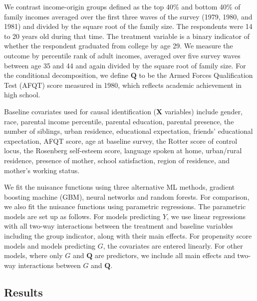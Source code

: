 \documentclass[12pt,a4paper]{article}
\def\X{{\boldsymbol X}}
\def\Q{{\boldsymbol Q}}
\begin{document}
We contrast income-origin groups defined as the top 40\% and bottom 40\% of family incomes averaged over the first three waves of the survey (1979, 1980, and 1981) and divided by the square root of the family size. The respondents were 14 to 20 years old during that time. The treatment variable is a binary indicator of whether the respondent graduated from college by age 29. We measure the outcome by percentile rank of adult incomes, averaged over five survey waves between age 35 and 44 and again divided by the square root of family size. For the conditional decomposition, we define $\Q$ to be the Armed Forces Qualification Test (AFQT) score measured in 1980, which reflects academic achievement in high school. 

Baseline covariates used for causal identification ($\X$ variables) include gender, race, parental income percentile, parental education, parental presence, the number of siblings, urban residence, educational expectation, friends' educational expectation, AFQT score, age at baseline survey, the Rotter score of control locus, the Rosenberg self-esteem score, language spoken at home, urban/rural residence, presence of mother, school satisfaction, region of residence, and mother's working status. 

We fit the nuisance functions using three alternative ML methods, gradient boosting machine (GBM), neural networks and random forests. For comparison, we also fit the nuisance functions using parametric regressions. The parametric models are set up as follows. For models predicting $Y$, we use linear regressions with all two-way interactions between the treatment and  baseline variables including the group indicator, along with their main effects. For propensity score models and models predicting $G$, the covariates are entered linearly. For other models, where only $G$ and $\Q$ are predictors, we include all main effects and two-way interactions between $G$ and $\Q$.

\subsection{Results}
\end{document}
